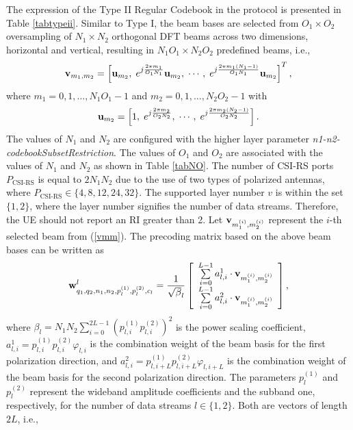 \documentclass[lettersize,journal]{IEEEtran}
\begin{document}
The expression of the Type II Regular Codebook in the protocol is presented in Table \ref{tabtypeii}. Similar to Type I, the beam bases are selected from $O_1 \times O_2$ oversampling of $N_1 \times N_2$ orthogonal DFT beams across two dimensions, horizontal and vertical, resulting in $N_1O_1 \times N_2O_2$ predefined beams, i.e.,
\begin{equation}\label{vmm}
 {\bf{v}}_{{m_1},m_2}=\left[ {\bf{u}}_{m_2},\; e^{j\frac{2\pi {m_1}}{O_1N_1}}{\bf{u}}_{m_2},\;\cdots, \;e^{j\frac{2\pi {m_1}(N_1-1)}{O_1N_1}}{\bf{u}}_{m_2} \right]^T,
\end{equation}
where ${m_1}=0,1,\ldots,N_1O_1-1$ and ${m_2}=0,1,\ldots,N_2O_2-1$ with
\begin{equation}
{\bf{u}}_{m_2}=\left[ 1, \; e^{j\frac{2\pi {m_2}}{O_2N_2}  },\; \cdots,\; e^{j\frac{2\pi {m_2}(N_2-1)}{O_2N_2}  }\right].
\end{equation}
The values of $N_1$ and $N_2$ are configured with the higher layer parameter \emph{n1-n2-codebookSubsetRestriction}. The values of $O_1$ and $O_2$ are associated with the values of $N_1$ and $N_2$ as shown in Table \ref{tabNO}. The number of CSI-RS ports ${P_{{\text{CSI-RS}}}}$ is equal to $2N_1N_2$ due to the use of two types of polarized antennas, where  ${P_{{\text{CSI-RS}}}} \in \{4,8,12,24,32\}.$ The supported layer number \(v\) is within the set \(\{1,2\}\), where the layer number signifies the number of data streams. Therefore, the UE should not report an RI greater than 2. Let ${\bf{v}}_{m_1^{(i)},m_2^{(i)}}$ represent the $i$-th selected beam from (\ref{vmm}). The precoding matrix based on the above beam bases can be written as 
\begin{equation}\label{a46}
 {\bf{w}}_{{q_1},{q_2},{n_1},{n_2},p_l^{(1)},p_l^{(2)},{c_l}}^l = \frac{1}{{\sqrt \beta _l  }}\left[ {\begin{array}{*{20}{c}}
{\sum\limits_{i = 0}^{L - 1} {a_{l,i}^1 \cdot { {\bf{v}}_{m_1^{(i)},m_2^{(i)}}}} }\\
{\sum\limits_{i = 0}^{L - 1} {a_{l,i}^2 \cdot { {\bf{v}}_{m_1^{(i)},m_2^{(i)}}}} }
\end{array}} \right],
\end{equation}
where ${\beta _l} = {N_1}{N_2}\sum\nolimits_{i = 0}^{2L - 1} {{{(p_{l,i}^{(1)}p_{l,i}^{(2)})}^2}}$ is the power scaling coefficient, $a_{l,i}^1 = p_{l,i}^{(1)}p_{l,i}^{(2)}{\varphi _{l,i}}$ is the combination weight of the beam basis for the first polarization direction, and $a_{l,i}^2 = p_{l,i + L}^{(1)}p_{l,i + L}^{(2)}{\varphi _{l,i + L}}$ is the combination weight of the beam basis for the second polarization direction. The parameters \(p^{(1)}_{l}\) and \(p^{(2)}_{l}\) represent the wideband amplitude coefficients and the subband one, respectively, for the number of data streams \(l \in \{1,2\}\). Both are vectors of length \(2L\), i.e.,
\end{document}
